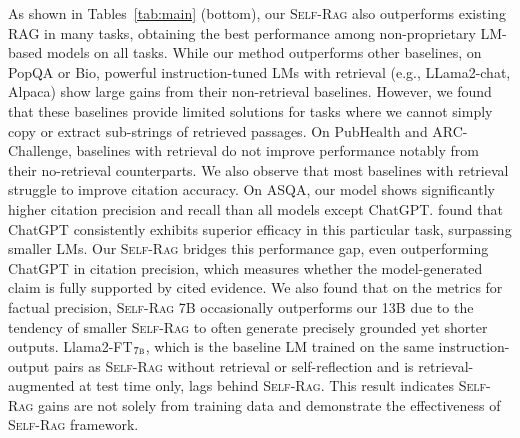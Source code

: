 \documentclass{article} %
\newcommand{\model}{\textsc{Self-Rag}\xspace}
\begin{document}
As shown in Tables~\ref{tab:main} (bottom), our \model also outperforms existing RAG in many tasks, obtaining the best performance among non-proprietary LM-based models on all tasks. 
While our method outperforms other baselines, on PopQA or Bio, powerful instruction-tuned LMs with retrieval (e.g., LLama2-chat, Alpaca) show large gains from their non-retrieval baselines. 
However, we found that these baselines provide limited solutions for tasks where we cannot simply copy or extract sub-strings of retrieved passages. 
On PubHealth and ARC-Challenge, baselines with retrieval do not improve performance notably from their no-retrieval counterparts.
We also observe that most baselines with retrieval struggle to improve citation accuracy. 
On ASQA, our model shows significantly higher citation precision and recall than all models except ChatGPT. 
\citet{gao2023enabling} found that ChatGPT consistently exhibits superior efficacy in this particular task, surpassing smaller LMs. 
{
Our \model bridges this performance gap, even outperforming ChatGPT in citation precision, which measures whether the model-generated claim is fully supported by cited evidence. } 
We also found that on the metrics for factual precision, \model 7B occasionally outperforms our 13B due to the tendency of smaller \model to often generate precisely grounded yet shorter outputs. 
{
Llama2-FT$_{\textsc{7b}}$, which is the baseline LM trained on the same instruction-output pairs as \model without retrieval or self-reflection and is retrieval-augmented at test time only, lags behind \model. This result indicates \model gains are not solely from training data and demonstrate the effectiveness of \model framework.  } 
\end{document}
